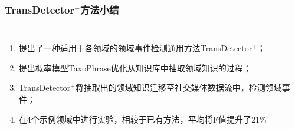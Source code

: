 \begin{frame}
\frametitle{\noindent TransDetector$^+$方法小结}

\begin{columns}

\begin{enumerate}
	\item 提出了一种适用于各领域的领域事件检测通用方法TransDetector$^+$；
	\item 提出概率模型TaxoPhrase优化从知识库中抽取领域知识的过程；
	\item TransDetector$^+$将抽取出的领域知识迁移至社交媒体数据流中，检测领域事件；
	\item 在4个示例领域中进行实验，相较于已有方法，平均将F值提升了21\%
\end{enumerate}


\end{columns}


\end{frame}
